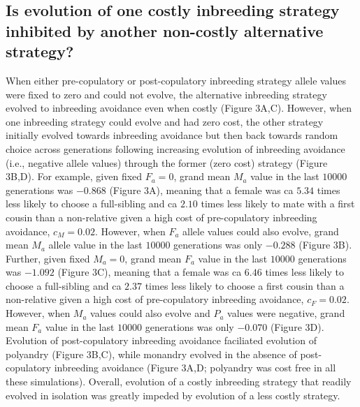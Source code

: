 \documentclass[10pt,letterpaper]{article}
\begin{document}
\subsection*{Is evolution of one costly inbreeding strategy inhibited by another non-costly alternative strategy?}

When either pre-copulatory or post-copulatory inbreeding strategy allele values were fixed to zero and could not evolve, the alternative inbreeding strategy evolved to inbreeding avoidance even when costly (Figure 3A,C). However, when one inbreeding strategy could evolve and had zero cost, the other strategy initially evolved towards inbreeding avoidance but then back towards random choice across generations following increasing evolution of inbreeding avoidance (i.e., negative allele values) through the former (zero cost) strategy (Figure 3B,D). For example, given fixed $F_{a}=0$, grand mean $M_{a}$ value in the last $10000$ generations was $-0.868$ (Figure 3A), meaning that a female was ca $5.34$ times less likely to choose a full-sibling and ca $2.10$ times less likely to mate with a first cousin than a non-relative given a high cost of pre-copulatory inbreeding avoidance, $c_{M}=0.02$. However, when $F_{a}$ allele values could also evolve, grand mean $M_{a}$ allele value in the last $10000$ generations was only $-0.288$ (Figure 3B). Further, given fixed $M_{a}=0$, grand mean $F_{a}$ value in the last $10000$ generations was $-1.092$ (Figure 3C), meaning that a female was ca $6.46$ times less likely to choose a full-sibling and ca $2.37$ times less likely to choose a first cousin than a non-relative given a high cost of pre-copulatory inbreeding avoidance, $c_{F}=0.02$. However, when $M_{a}$ values could also evolve and $P_{a}$ values were negative, grand mean $F_{a}$ value in the last $10000$ generations was only $-0.070$ (Figure 3D). Evolution of post-copulatory inbreeding avoidance faciliated evolution of polyandry (Figure 3B,C), while monandry evolved in the absence of post-copulatory inbreeding avoidance (Figure 3A,D; polyandry was cost free in all these simulations). Overall, evolution of a costly inbreeding strategy that readily evolved in isolation was greatly impeded by evolution of a less costly strategy.
\end{document}
